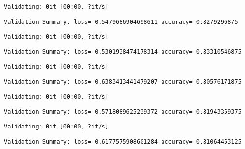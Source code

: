 \documentclass[11pt]{article}
\begin{document}
    
    \begin{Verbatim}[commandchars=\\\{\}]
Validating: 0it [00:00, ?it/s]
    \end{Verbatim}

    
    \begin{Verbatim}[commandchars=\\\{\}]
Validation Summary: loss= 0.5479686904698611 accuracy= 0.8279296875
    \end{Verbatim}

    
    \begin{Verbatim}[commandchars=\\\{\}]
Validating: 0it [00:00, ?it/s]
    \end{Verbatim}

    
    \begin{Verbatim}[commandchars=\\\{\}]
Validation Summary: loss= 0.5301938474178314 accuracy= 0.83310546875
    \end{Verbatim}

    
    \begin{Verbatim}[commandchars=\\\{\}]
Validating: 0it [00:00, ?it/s]
    \end{Verbatim}

    
    \begin{Verbatim}[commandchars=\\\{\}]
Validation Summary: loss= 0.6383413441479207 accuracy= 0.80576171875
    \end{Verbatim}

    
    \begin{Verbatim}[commandchars=\\\{\}]
Validating: 0it [00:00, ?it/s]
    \end{Verbatim}

    
    \begin{Verbatim}[commandchars=\\\{\}]
Validation Summary: loss= 0.5718089625239372 accuracy= 0.81943359375
    \end{Verbatim}

    
    \begin{Verbatim}[commandchars=\\\{\}]
Validating: 0it [00:00, ?it/s]
    \end{Verbatim}

    
    \begin{Verbatim}[commandchars=\\\{\}]
Validation Summary: loss= 0.6177575908601284 accuracy= 0.81064453125
    \end{Verbatim}
\end{document}
